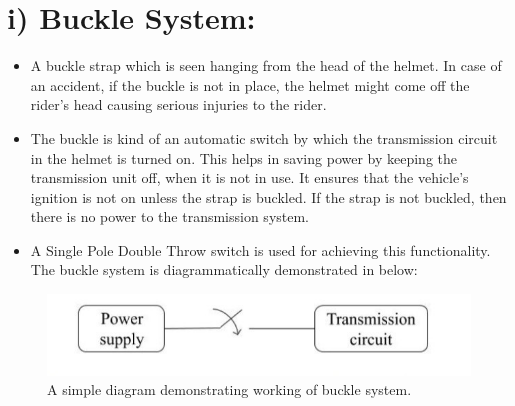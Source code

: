 \section*{i) Buckle System:}
\begin{itemize}

\item A buckle strap which is seen hanging from the head of the helmet. In case of an accident, if the buckle is not in place, the helmet might come off the rider’s head causing serious injuries to the rider.
\item	The buckle is kind of an automatic switch by which the transmission circuit in the helmet is turned on. This helps in saving power by keeping the transmission unit off, when it is not in use. It ensures that the vehicle’s ignition is not on unless the strap is buckled. If the strap is not buckled, then  there  is no  power  to  the  transmission system.
\item	A Single Pole Double Throw switch is used for achieving this functionality. The buckle system is diagrammatically demonstrated in below:

\end{itemize}
\begin{figure}[h]
	\centering
	\includegraphics[width=0.7\linewidth]{"images/buckle working"}
	\captionsetup{labelformat=empty}
	\caption[]{A simple diagram demonstrating working of buckle system.}	
\end{figure}

